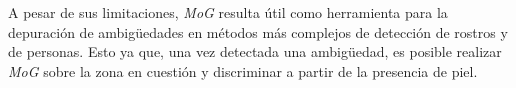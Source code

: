 \documentclass[12pt]{article}
\begin{document}
A pesar de sus limitaciones, \emph{MoG} resulta útil como herramienta para la
depuración de ambigüedades en métodos más complejos de detección de rostros y de
personas. Esto ya que, una vez detectada una ambigüedad, es posible realizar
\emph{MoG} sobre la zona en cuestión y discriminar a partir de la presencia de
piel.





\end{document}
